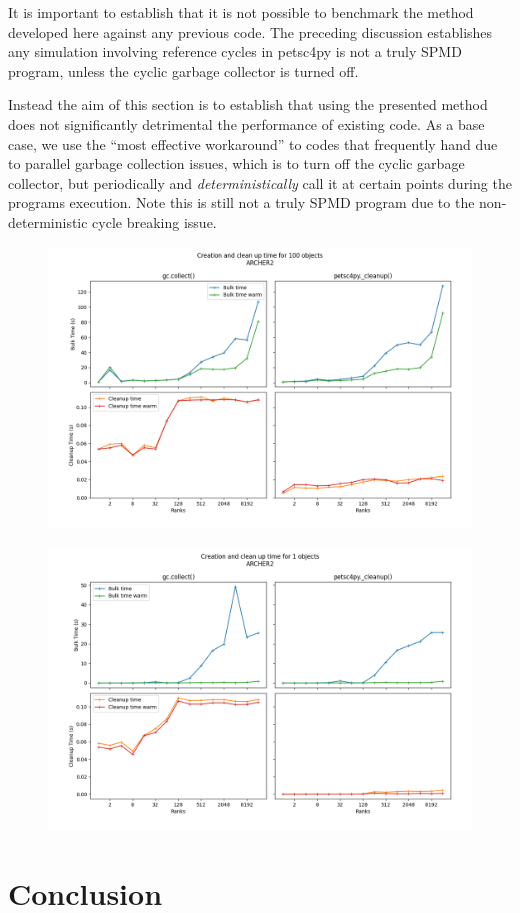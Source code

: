 \documentclass[10pt,journal,compsoc]{IEEEtran}
\begin{document}
It is important to establish that it is not possible to benchmark the method developed here against any previous code.
The preceding discussion establishes any simulation involving reference cycles in petsc4py is not a truly SPMD program, unless the cyclic garbage collector is turned off.

Instead the aim of this section is to establish that using the presented method does not significantly detrimental the performance of existing code.
As a base case, we use the ``most effective workaround'' to codes that frequently hand due to parallel garbage collection issues, which is to turn off the cyclic garbage collector, but periodically and \emph{deterministically} call it at certain points during the programs execution.
Note this is still not a truly SPMD program due to the non-deterministic cycle breaking issue.

\clearpage
\begin{figure}[htb]
	\centering
	\includegraphics[width=\textwidth]{D100BS128B_222.png}
	\vspace{-1em}
	\caption{}
	\label{fig:}
\end{figure}

\clearpage
\begin{figure}[htb]
	\centering
	\includegraphics[width=\textwidth]{D1BS128B_5005.png}
	\vspace{-1em}
	\caption{}
	\label{fig:}
\end{figure}


\section{Conclusion}
\label{sec:conclusion}




\end{document}
